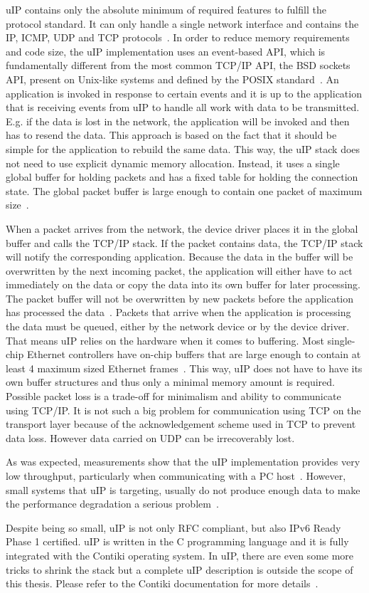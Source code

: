 uIP contains only the absolute minimum of required features to fulfill the protocol standard.
It can only handle a single network interface and contains the IP, ICMP, UDP and TCP protocols~\cite{contiki-docs}.
In order to reduce memory requirements and code size,
the uIP implementation uses an event-based API, which is fundamentally different
from the most common TCP/IP API, the BSD sockets API, present on Unix-like systems
and defined by the POSIX standard~\cite{thesis-programming,posix}.
An application is invoked in response to certain events and
it is up to the application that is receiving events from uIP to handle all
work with data to be transmitted. E.g. if the data is lost in the network,
the application will be invoked and then has to resend the data.
This approach is based on the fact that it should be simple for the application
to rebuild the same data.
This way, the uIP stack does not need to use explicit dynamic memory allocation.
Instead, it uses a single global buffer for holding packets and has a fixed
table for holding the connection state.
The global packet buffer is large enough to contain one packet of maximum size~\cite{contiki-docs}.

When a packet arrives from the network, the device driver places it in the
global buffer and calls the TCP/IP stack.
If the packet contains data, the TCP/IP stack will notify the corresponding application.
Because the data in the buffer will be overwritten by the next incoming packet,
the application will either have to act immediately on the data or copy the data into
its own buffer for later processing.
The packet buffer will not be overwritten by new packets before the application has processed the data~\cite{contiki-docs}.
Packets that arrive when the application is processing the data must be queued,
either by the network device or by the device driver.
That means uIP relies on the hardware when it comes to buffering.
Most single-chip Ethernet controllers have on-chip buffers
that are large enough to contain at least 4 maximum sized Ethernet frames~\cite{contiki-docs}.
This way, uIP does not have to have its own buffer structures and thus
only a minimal memory amount is required.
Possible packet loss is a trade-off for minimalism and ability to communicate using TCP/IP.
It is not such a big problem for communication using TCP on the transport layer
because of the acknowledgement scheme used in TCP to prevent data loss.
However data carried on UDP can be irrecoverably lost.

As was expected, measurements show that the uIP implementation provides very low
throughput, particularly when communicating with a PC host~\cite{thesis-towards}.
However, small systems that uIP is targeting, usually do not produce enough data
to make the performance degradation a serious problem~\cite{thesis-towards}.

Despite being so small, uIP is not only RFC compliant, but also IPv6 Ready Phase 1 certified.
uIP is written in the C programming language and it is fully integrated with the Contiki operating system.
In uIP, there are even some more tricks to shrink the stack
but a complete uIP description is outside the scope of this thesis.
Please refer to the Contiki documentation for more details~\cite{contiki-docs}.
